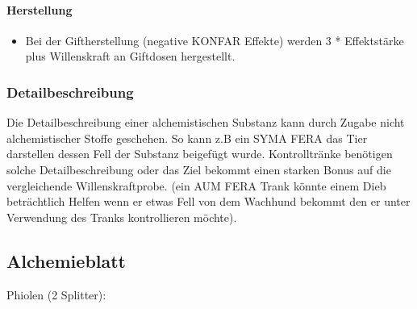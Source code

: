 \documentclass{article}
\begin{document}
\paragraph{Herstellung}

\begin{itemize}
\item Bei der Giftherstellung (negative KONFAR Effekte) werden 3 * Effektstärke plus Willenskraft an Giftdosen hergestellt.
\end{itemize}

\subsubsection{Detailbeschreibung}

Die Detailbeschreibung einer alchemistischen Substanz kann durch Zugabe nicht alchemistischer Stoffe
geschehen. So kann z.B ein SYMA FERA das Tier darstellen dessen Fell der Substanz beigefügt wurde.
Kontrolltränke benötigen solche Detailbeschreibung oder das Ziel bekommt einen starken Bonus auf die vergleichende
Willenskraftprobe. (ein AUM FERA Trank könnte einem Dieb beträchtlich Helfen wenn er
etwas Fell von dem Wachhund bekommt den er unter Verwendung des Tranks kontrollieren möchte).

\newpage

\begin{center}
\subsection{Alchemieblatt}
\end{center}
Phiolen (2 Splitter):
\end{document}
